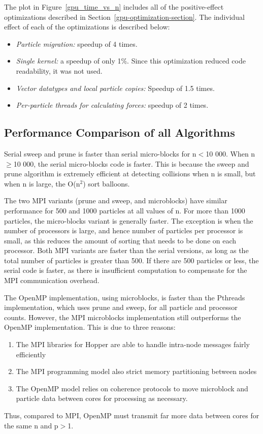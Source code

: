 \documentclass[11pt]{article} %
\begin{document}
The plot in Figure~\ref{gpu_time_vs_n} includes all of the positive-effect optimizations described in Section~\ref{gpu-optimization-section}. The individual effect of each of the optimizations is described below:

\begin{itemize}
\item {\em Particle migration: } speedup of 4 times.
\item {\em Single kernel: } a speedup of only 1\%. Since this optimization reduced code readability, it was not used.
\item {\em Vector datatypes and local particle copies: } Speedup of 1.5 times.
\item {\em Per-particle threads for calculating forces: } speedup of 2 times.

\end{itemize}

\subsection{Performance Comparison of all Algorithms}

Serial sweep and prune is faster than serial micro-blocks for n$<$10 000. When n$\geq$10 000, the serial micro-blocks code is faster. This is because the sweep and prune algorithm is extremely efficient at detecting collisions when n is small, but when n is large, the O(n$^2$) sort balloons.

The two MPI variants (prune and sweep, and microblocks) have similar performance for 500 and 1000 particles at all values of n. For more than 1000 particles, the micro-blocks variant is generally faster. The exception is when the number of processors is large, and hence number of particles per processor is small, as this reduces the amount of sorting that needs to be done on each processor. Both MPI variants are faster than the serial versions, as long as the total number of particles is greater than 500. If there are 500 particles or less, the serial code is faster, as there is insufficient computation to compensate for the MPI communication overhead.

The OpenMP implementation, using microblocks, is faster than the Pthreads implementation, which uses prune and sweep, for all particle and processor counts. However, the MPI microblocks implementation still outperforms the OpenMP implementation. This is due to three reasons:
\begin{enumerate}
\item The MPI libraries for Hopper are able to handle intra-node messages fairly efficiently
\item The MPI programming model also strict memory partitioning between nodes
\item The OpenMP model relies on coherence protocols to move microblock and particle data between cores for processing as necessary. 
\end{enumerate}
Thus, compared to MPI, OpenMP must transmit far more data between cores for the same n and p$>$1.
\end{document}

